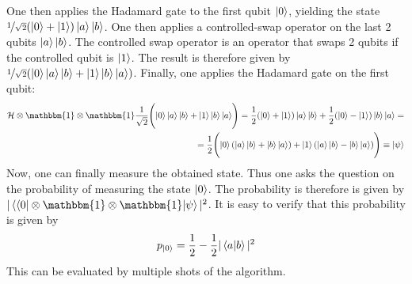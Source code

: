 One then applies the Hadamard gate to the first qubit $\ket{0}$, yielding the state $\nicefrac{1}{\sqrt{2}}(\ket{0}+\ket{1})\ket{a}\ket{b}$.
One then applies a controlled-swap operator on the last 2 qubits $\ket{a}\ket{b}$. 
The controlled swap operator is an operator that swaps 2 qubits if the controlled qubit is $\ket{1}$. 
The result is therefore given by $\nicefrac{1}{\sqrt{2}}(\ket{0}\ket{a}\ket{b}+\ket{1}\ket{b}\ket{a})$. Finally, one applies 
the Hadamard gate on the first qubit:
\begin{equation}
  \begin{split}
  \mathcal{H}\otimes\mathbbm{1}\otimes \mathbbm{1}  \frac{1}{\sqrt{2}}\Biggl(\ket{0}\ket{a}\ket{b}+\ket{1}\ket{b}\ket{a}\Biggr) = 
  \frac{1}{2}(\ket{0}+\ket{1})\ket{a}\ket{b} + \frac{1}{2}(\ket{0}-\ket{1})\ket{b}\ket{a} = \\
  = \frac{1}{2}\Biggl( \ket{0}(\ket{a}\ket{b}+\ket{b}\ket{a}) + \ket{1}(\ket{a}\ket{b}-\ket{b}\ket{a})\Biggr) \equiv \ket{\psi}
\end{split}
\end{equation}
Now, one can finally measure the obtained state. Thus one asks the question on the probability of measuring the 
state $\ket{0}$. The probability is therefore is given by $|\bra{\bra{0}\otimes \mathbbm{1}\otimes \mathbbm{1}}\ket{\psi}|^2$.
It is easy to verify that this probability is given by 
\begin{equation}
  p_{\ket{0}} = \frac{1}{2} - \frac{1}{2}|\bra{a}\ket{b}|^2
\end{equation}
This can be evaluated by multiple shots of the algorithm.











